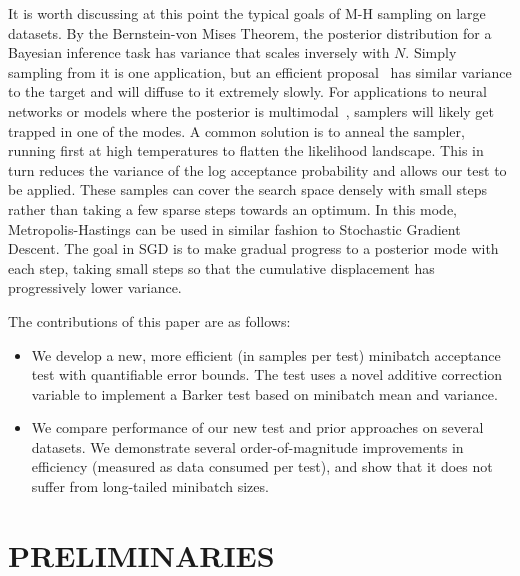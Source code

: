 \documentclass{article}
\begin{document}
It is worth discussing at this point the typical goals of M-H sampling on large
datasets. By the Bernstein-von Mises Theorem, the posterior distribution for a
Bayesian inference task has variance that scales inversely with $N$. Simply
sampling from it is one application, but an efficient
proposal~\cite{OptimalScaling01} has similar variance to the target and will
diffuse to it extremely slowly. For applications to neural networks or models
where the posterior is multimodal~\cite{choromanska2014loss}, samplers will
likely get trapped in one of the modes. A common solution is to anneal the
sampler, running first at high temperatures to flatten the likelihood landscape.
This in turn reduces the variance of the log acceptance probability and allows
our test to be applied. These samples can cover the search space densely with
small steps rather than taking a few sparse steps towards an optimum. In this
mode, Metropolis-Hastings can be used in similar fashion to Stochastic Gradient
Descent. The goal in SGD is to make gradual progress to a posterior mode with
each step, taking small steps so that the cumulative displacement has
progressively lower variance.



The contributions of this paper are as follows:

\begin{itemize}[noitemsep]
    \item We develop a new, more efficient (in samples per test) minibatch
    acceptance test with quantifiable error bounds. The test uses a novel
    additive correction variable to implement a Barker test based on minibatch
    mean and variance. 


    \item We compare performance of our new test and prior approaches on several
    datasets. We demonstrate several order-of-magnitude improvements in efficiency
    (measured as data consumed per test), and show that it does not suffer from
    long-tailed minibatch sizes.
\end{itemize}



\section{PRELIMINARIES}\label{sec:related_work}
\end{document}
